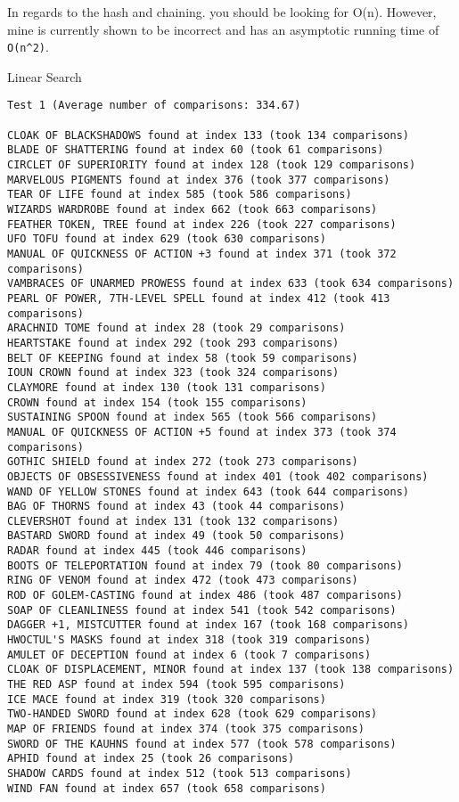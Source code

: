 \documentclass{article}
\begin{document}
In regards to the hash and chaining. you should be looking for O(n). However, mine is currently shown to be incorrect and has an asymptotic running time of \verb|O(n^2)|.  
    


\pagebreak
 
\begin{large}
    Linear Search
\end{large}

\begin{verbatim}
Test 1 (Average number of comparisons: 334.67)

CLOAK OF BLACKSHADOWS found at index 133 (took 134 comparisons)
BLADE OF SHATTERING found at index 60 (took 61 comparisons)
CIRCLET OF SUPERIORITY found at index 128 (took 129 comparisons)
MARVELOUS PIGMENTS found at index 376 (took 377 comparisons)
TEAR OF LIFE found at index 585 (took 586 comparisons)
WIZARDS WARDROBE found at index 662 (took 663 comparisons)
FEATHER TOKEN, TREE found at index 226 (took 227 comparisons)
UFO TOFU found at index 629 (took 630 comparisons)
MANUAL OF QUICKNESS OF ACTION +3 found at index 371 (took 372 comparisons)
VAMBRACES OF UNARMED PROWESS found at index 633 (took 634 comparisons)
PEARL OF POWER, 7TH-LEVEL SPELL found at index 412 (took 413 comparisons)
ARACHNID TOME found at index 28 (took 29 comparisons)
HEARTSTAKE found at index 292 (took 293 comparisons)
BELT OF KEEPING found at index 58 (took 59 comparisons)
IOUN CROWN found at index 323 (took 324 comparisons)
CLAYMORE found at index 130 (took 131 comparisons)
CROWN found at index 154 (took 155 comparisons)
SUSTAINING SPOON found at index 565 (took 566 comparisons)
MANUAL OF QUICKNESS OF ACTION +5 found at index 373 (took 374 comparisons)
GOTHIC SHIELD found at index 272 (took 273 comparisons)
OBJECTS OF OBSESSIVENESS found at index 401 (took 402 comparisons)
WAND OF YELLOW STONES found at index 643 (took 644 comparisons)
BAG OF THORNS found at index 43 (took 44 comparisons)
CLEVERSHOT found at index 131 (took 132 comparisons)
BASTARD SWORD found at index 49 (took 50 comparisons)
RADAR found at index 445 (took 446 comparisons)
BOOTS OF TELEPORTATION found at index 79 (took 80 comparisons)
RING OF VENOM found at index 472 (took 473 comparisons)
ROD OF GOLEM-CASTING found at index 486 (took 487 comparisons)
SOAP OF CLEANLINESS found at index 541 (took 542 comparisons)
DAGGER +1, MISTCUTTER found at index 167 (took 168 comparisons)
HWOCTUL'S MASKS found at index 318 (took 319 comparisons)
AMULET OF DECEPTION found at index 6 (took 7 comparisons)
CLOAK OF DISPLACEMENT, MINOR found at index 137 (took 138 comparisons)
THE RED ASP found at index 594 (took 595 comparisons)
ICE MACE found at index 319 (took 320 comparisons)
TWO-HANDED SWORD found at index 628 (took 629 comparisons)
MAP OF FRIENDS found at index 374 (took 375 comparisons)
SWORD OF THE KAUHNS found at index 577 (took 578 comparisons)
APHID found at index 25 (took 26 comparisons)
SHADOW CARDS found at index 512 (took 513 comparisons)
WIND FAN found at index 657 (took 658 comparisons)
\end{verbatim}
\end{document}
